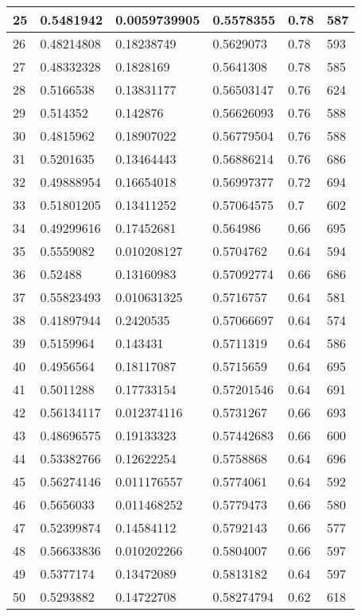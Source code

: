 \begin{longtable}{|l|l|l|l|l|l|}
25 & 0.5481942 & 0.0059739905 & 0.5578355 & 0.78 & 587 \\ \hline 
26 & 0.48214808 & 0.18238749 & 0.5629073 & 0.78 & 593 \\ \hline 
27 & 0.48332328 & 0.1828169 & 0.5641308 & 0.78 & 585 \\ \hline 
28 & 0.5166538 & 0.13831177 & 0.56503147 & 0.76 & 624 \\ \hline 
29 & 0.514352 & 0.142876 & 0.56626093 & 0.76 & 588 \\ \hline 
30 & 0.4815962 & 0.18907022 & 0.56779504 & 0.76 & 588 \\ \hline 
31 & 0.5201635 & 0.13464443 & 0.56886214 & 0.76 & 686 \\ \hline 
32 & 0.49888954 & 0.16654018 & 0.56997377 & 0.72 & 694 \\ \hline 
33 & 0.51801205 & 0.13411252 & 0.57064575 & 0.7 & 602 \\ \hline 
34 & 0.49299616 & 0.17452681 & 0.564986 & 0.66 & 695 \\ \hline 
35 & 0.5559082 & 0.010208127 & 0.5704762 & 0.64 & 594 \\ \hline 
36 & 0.52488 & 0.13160983 & 0.57092774 & 0.66 & 686 \\ \hline 
37 & 0.55823493 & 0.010631325 & 0.5716757 & 0.64 & 581 \\ \hline 
38 & 0.41897944 & 0.2420535 & 0.57066697 & 0.64 & 574 \\ \hline 
39 & 0.5159964 & 0.143431 & 0.5711319 & 0.64 & 586 \\ \hline 
40 & 0.4956564 & 0.18117087 & 0.5715659 & 0.64 & 695 \\ \hline 
41 & 0.5011288 & 0.17733154 & 0.57201546 & 0.64 & 691 \\ \hline 
42 & 0.56134117 & 0.012374116 & 0.5731267 & 0.66 & 693 \\ \hline 
43 & 0.48696575 & 0.19133323 & 0.57442683 & 0.66 & 600 \\ \hline 
44 & 0.53382766 & 0.12622254 & 0.5758868 & 0.64 & 696 \\ \hline 
45 & 0.56274146 & 0.011176557 & 0.5774061 & 0.64 & 592 \\ \hline 
46 & 0.5656033 & 0.011468252 & 0.5779473 & 0.66 & 580 \\ \hline 
47 & 0.52399874 & 0.14584112 & 0.5792143 & 0.66 & 577 \\ \hline 
48 & 0.56633836 & 0.010202266 & 0.5804007 & 0.66 & 597 \\ \hline 
49 & 0.5377174 & 0.13472089 & 0.5813182 & 0.64 & 597 \\ \hline 
50 & 0.5293882 & 0.14722708 & 0.58274794 & 0.62 & 618 \\ \hline 
\end{longtable}